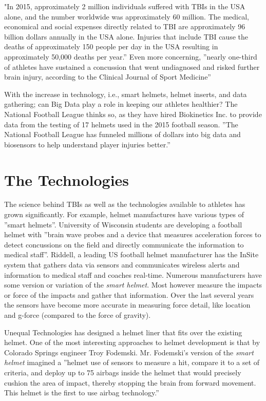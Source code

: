 \documentclass[sigconf]{acmart}
\begin{document}
"In 2015, approximately 2 million individuals suffered with TBIs in the USA alone, and the number worldwide was approximately 60 million.  The medical, economical and social expenses directly related to TBI are approximately 96 billion dollars annually in the USA alone.  Injuries that include TBI cause the deaths of approximately 150 people per day in the USA resulting in approximately 50,000 deaths per year.''\cite{www-futuremedicine-com}  Even more concerning, ''nearly one-third of athletes have sustained a concussion that went undiagnosed and risked further brain injury, according to the Clinical Journal of Sport Medicine'' \cite{www-eptechview-tthuhsc-edu}

With the increase in technology, i.e., smart helmets, helmet inserts, and data gathering; can Big Data play a role in keeping our athletes healthier?  The National Football League thinks so, as they have hired Biokinetics Inc. to provide data from the testing of 17 helmets used in the 2015 football season.  ''The National Football League has funneled millions of dollars into big data and biosensors to help understand player injuries better.''\cite{www-zdnet-com}


\section{The Technologies}

The science behind TBIs as well as the technologies available to athletes has grown significantly.  For example, helmet manufactures have various types of ''smart helmets''.  University of Wisconsin students are developing a football helmet with ''brain wave probes and a device that measures acceleration forces to detect concussions on the field and directly communicate the information to medical staff''. \cite{www-jsonline-com} Riddell, a leading US football helmet manufacturer has the InSite system that gathers data via sensors and communicates wireless alerts and information to medical staff and coaches real-time.  Numerous manufacturers have some version or variation of the {\em smart helmet}.  Most however measure the impacts or force of the impacts and gather that information.  Over the last several years the sensors have become more accurate in measuring force detail, like location and g-force (compared to the force of gravity).  

Unequal Technologies has designed a helmet liner that fits over the existing helmet.  One of the most interesting approaches to helmet development is that by Colorado Springs engineer Troy Fodemski.  Mr. Fodemski's version of the {\em smart helmet} imagined a ''helmet use of sensors to measure a hit, compare it to a set of criteria, and deploy up to 75 airbags inside the helmet that would precisely cushion the area of impact, thereby stopping the brain from forward movement.  This helmet is the first to use airbag technology.''\cite{www-designworldonline-com}
\end{document}

